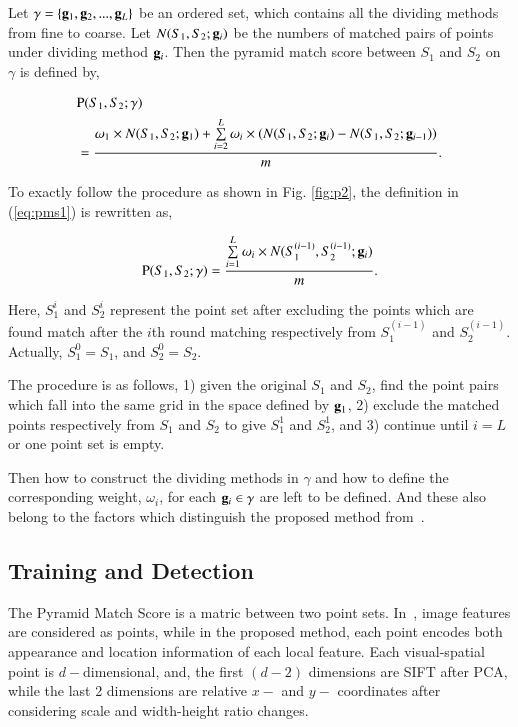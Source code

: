 \documentclass[paper]{ieice}
\begin{document}
Let $\gamma  = \{ {{\bf{g}}_1},{{\bf{g}}_2},...,{{\bf{g}}}_L\}$ be an ordered set, which contains all the dividing methods from fine to coarse. Let $N(S_1,S_2;{\bf{g}}_i)$ be the numbers of matched pairs of points under dividing method ${\bf{g}}_i$. Then the pyramid match score between $S_1$ and $S_2$ on $\gamma$ is defined by,

\begin{equation}
\begin{aligned}
&{\rm P}(S_1,S_2;\gamma)\\&=\frac{{\omega}_1 \times N(S_1,S_2; {\bf{g}}_1) + \sum\limits^L_{i=2}{{\omega}_i\times( N(S_1,S_2;{\bf{g}}_i)-N(S_1,S_2;{\bf{g}}_{i-1}) ) }}{m}
.
\end{aligned}
\label{eq:pms1}
\end{equation}

To exactly follow the procedure as shown in Fig. \ref{fig:p2}, the definition in (\ref{eq:pms1}) is rewritten as,

\begin{equation}
{\rm P}(S_1,S_2;\gamma)=\frac{ \sum\limits^L_{i=1}{{\omega}_i\times N(S_1^{(i-1)},S_2^{(i-1)};{\bf{g}}_i) }}{m}
.
\label{eq:pms2}
\end{equation}

Here, $S_1^i$ and $S_2^i$ represent the point set after excluding the points which are found match after the $i$th round matching respectively from $S_1^{(i-1)}$ and $S_2^{(i-1)}$. Actually, $S_1^0=S_1$, and $S_2^0=S_2$.

The procedure is  as follows, 1) given the original $S_1$ and $S_2$, find the point pairs which fall into the same grid in the space defined by ${\bf g}_1$, 2) exclude the matched points respectively from $S_1$ and $S_2$ to give $S_1^1$ and $S_2^1$, and 3) continue until $i=L$ or one point set is empty.

Then how to construct the dividing methods in $\gamma$ and how to define the corresponding weight, ${\omega}_i$, for each ${\bf{g}}_i \in \gamma$ are left to be defined.
And these also belong to the factors which distinguish the proposed method from~\cite{pmk}.


\subsection{Training and Detection}

The Pyramid Match Score is a matric between two point sets. In~\cite{pmk}, image features are considered as points, while in the proposed method, each point encodes both appearance and location information of each local feature. Each visual-spatial point is $d-$dimensional, and, the first $(d-2)$ dimensions are SIFT after PCA, while the last 2 dimensions are relative $x-$ and $y-$ coordinates after considering scale and width-height ratio changes.
\end{document}
